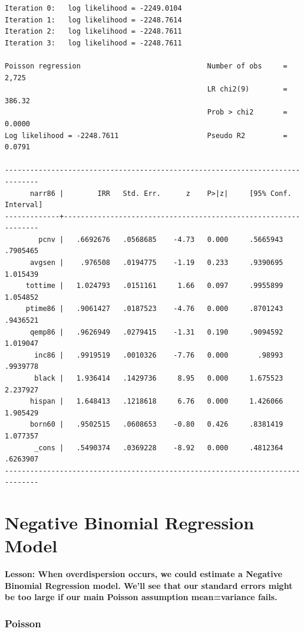 \documentclass[
]{book}
\begin{document}
\begin{verbatim}
Iteration 0:   log likelihood = -2249.0104  
Iteration 1:   log likelihood = -2248.7614  
Iteration 2:   log likelihood = -2248.7611  
Iteration 3:   log likelihood = -2248.7611  

Poisson regression                              Number of obs     =      2,725
                                                LR chi2(9)        =     386.32
                                                Prob > chi2       =     0.0000
Log likelihood = -2248.7611                     Pseudo R2         =     0.0791

------------------------------------------------------------------------------
      narr86 |        IRR   Std. Err.      z    P>|z|     [95% Conf. Interval]
-------------+----------------------------------------------------------------
        pcnv |   .6692676   .0568685    -4.73   0.000     .5665943    .7905465
      avgsen |    .976508   .0194775    -1.19   0.233     .9390695    1.015439
     tottime |   1.024793   .0151161     1.66   0.097     .9955899    1.054852
     ptime86 |   .9061427   .0187523    -4.76   0.000     .8701243    .9436521
      qemp86 |   .9626949   .0279415    -1.31   0.190     .9094592    1.019047
       inc86 |   .9919519   .0010326    -7.76   0.000       .98993    .9939778
       black |   1.936414   .1429736     8.95   0.000     1.675523    2.237927
      hispan |   1.648413   .1218618     6.76   0.000     1.426066    1.905429
      born60 |   .9502515   .0608653    -0.80   0.426     .8381419    1.077357
       _cons |   .5490374   .0369228    -8.92   0.000     .4812364    .6263907
------------------------------------------------------------------------------
\end{verbatim}

\chapter{Negative Binomial Regression Model}\label{negative-binomial-regression-model}

\textbf{Lesson: When overdispersion occurs, we could estimate a Negative Binomial Regression model. We'll see that our standard errors might be too large if our main Poisson assumption mean=variance fails.}

\subsection*{Poisson}\label{poisson-1}
\end{document}
